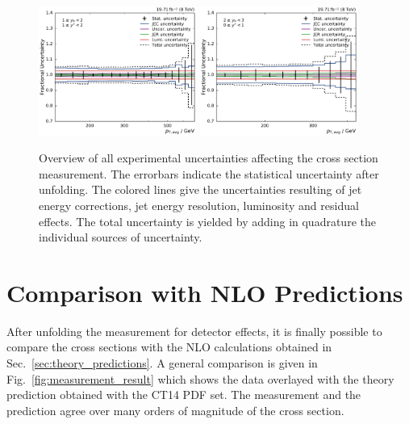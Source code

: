 \begin{figure}[htbp]
    \includegraphics[width=0.46\textwidth]{figures/measurement/exp_unc_overview_yb1ys1.pdf}\hfill
    \includegraphics[width=0.46\textwidth]{figures/measurement/exp_unc_overview_yb2ys0.pdf}
    \caption[Overview of experimental uncertainties]{Overview of all
    experimental uncertainties affecting the cross section measurement. The
    errorbars indicate the statistical uncertainty after unfolding. The colored
    lines give the uncertainties resulting of jet energy corrections, jet energy
    resolution, luminosity and residual effects. The total uncertainty is yielded by
    adding in quadrature the individual sources of uncertainty.}
    \label{fig:exp_unc_overview}
\end{figure}

\section{Comparison with NLO Predictions}
\label{sec:nlo_comparisons}

After unfolding the measurement for detector effects, it is finally possible to
compare the cross sections with the NLO calculations obtained in
Sec.~\ref{sec:theory_predictions}. A general comparison is given in
Fig.~\ref{fig:measurement_result} which shows the data overlayed with the
\NLOJETPP theory prediction obtained with the CT14 PDF set. The measurement and the
prediction agree over many orders of magnitude of the cross section.

